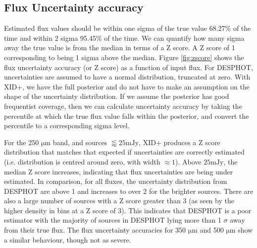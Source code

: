 \documentclass[useAMS,usenatbib]{mnras}
\begin{document}
\subsection{Flux Uncertainty accuracy}
Estimated flux values should be within one sigma of the true value 68.27\% of the time and within 2 sigma 95.45\% of the time. We can quantify how many sigma away the true value is from the median in terms of a Z score. A Z score of 1 corresponding to being 1 sigma above the median. Figure \ref{fig:zscore} shows the flux uncertainty accuracy (or Z score) as a function of input flux. For \textsc{DESPHOT}, uncertainties are assumed to have a normal distribution, truncated at zero. With \textsc{XID+}, we have the full posterior and do not have to make an assumption on the shape of the uncertainty distribution. If we assume the posterior has good frequentist coverage, then we can calculate uncertainty accuracy by taking the percentile at which the true flux value falls within the posterior, and convert the percentile to a corresponding sigma level.

For the 250 $\mathrm{\mu m}$ band, and sources $\lessapprox25\mathrm{m Jy}$, \textsc{XID+} produces a Z score distribution that matches that expected if uncertainties are correctly estimated (i.e. distribution is centred around zero, with width $\approx 1$). Above $25\mathrm{mJy}$, the median Z score increases, indicating that flux uncertainties are being under estimated. In comparison, for all fluxes, the uncertainty distribution from \textsc{DESPHOT} are above 1 and increases to over 2 for the brighter sources. There are also a large number of sources with a Z score greater than 3 (as seen by the higher density in bins at a Z score of 3). This indicates that \textsc{DESPHOT} is a poor estimator with the majority of sources in \textsc{DESPHOT} lying more than 1 $\sigma$ away from their true flux. The flux uncertainty accuracies for 350 $\mathrm{\mu m}$ and 500 $\mathrm{\mu m}$ show a similar behaviour, though not as severe.
\end{document}
